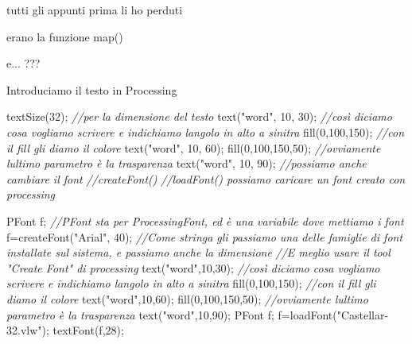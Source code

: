 \documentclass[
]{article}
\author{}
\date{}
\newenvironment{Shaded}{}{}
\newcommand{\CommentTok}[1]{\textcolor[rgb]{0.38,0.63,0.69}{\textit{#1}}}
\newcommand{\DecValTok}[1]{\textcolor[rgb]{0.25,0.63,0.44}{#1}}
\newcommand{\FunctionTok}[1]{\textcolor[rgb]{0.02,0.16,0.49}{#1}}
\newcommand{\NormalTok}[1]{#1}
\newcommand{\OperatorTok}[1]{\textcolor[rgb]{0.40,0.40,0.40}{#1}}
\newcommand{\StringTok}[1]{\textcolor[rgb]{0.25,0.44,0.63}{#1}}
\begin{document}
tutti gli appunti prima li ho perduti

erano la funzione map()

e... ???

Introduciamo il testo in Processing

\begin{Shaded}
\begin{Highlighting}[]
\FunctionTok{textSize}\OperatorTok{(}\DecValTok{32}\OperatorTok{);} \CommentTok{//per la dimensione del testo}
\FunctionTok{text}\OperatorTok{(}\StringTok{"word"}\OperatorTok{,} \DecValTok{10}\OperatorTok{,} \DecValTok{30}\OperatorTok{);} \CommentTok{//così diciamo cosa vogliamo scrivere e indichiamo l\textquotesingle{}angolo in alto a sinitra}
\FunctionTok{fill}\OperatorTok{(}\DecValTok{0}\OperatorTok{,}\DecValTok{100}\OperatorTok{,}\DecValTok{150}\OperatorTok{);} \CommentTok{//con il fill gli diamo il colore}
\FunctionTok{text}\OperatorTok{(}\StringTok{"word"}\OperatorTok{,} \DecValTok{10}\OperatorTok{,} \DecValTok{60}\OperatorTok{);}
\FunctionTok{fill}\OperatorTok{(}\DecValTok{0}\OperatorTok{,}\DecValTok{100}\OperatorTok{,}\DecValTok{150}\OperatorTok{,}\DecValTok{50}\OperatorTok{);} \CommentTok{//ovviamente l\textquotesingle{}ultimo parametro è la trasparenza}
\FunctionTok{text}\OperatorTok{(}\StringTok{"word"}\OperatorTok{,} \DecValTok{10}\OperatorTok{,} \DecValTok{90}\OperatorTok{);}
\CommentTok{//possiamo anche cambiare il font}
\CommentTok{//createFont() }
\CommentTok{//loadFont() possiamo caricare un font creato con processing}

\NormalTok{PFont f}\OperatorTok{;} \CommentTok{//PFont sta per ProcessingFont, ed è una variabile dove mettiamo i font}
\NormalTok{f}\OperatorTok{=}\FunctionTok{createFont}\OperatorTok{(}\StringTok{"Arial"}\OperatorTok{,} \DecValTok{40}\OperatorTok{);} \CommentTok{//Come stringa gli passiamo una delle famiglie di font installate sul sistema, e passiamo anche la dimensione}
    \CommentTok{//E\textquotesingle{} meglio usare il tool "Create Font" di processing}
\FunctionTok{text}\OperatorTok{(}\StringTok{"word"}\OperatorTok{,}\DecValTok{10}\OperatorTok{,}\DecValTok{30}\OperatorTok{);} \CommentTok{//così diciamo cosa vogliamo scrivere e indichiamo l\textquotesingle{}angolo in alto a sinitra}
\FunctionTok{fill}\OperatorTok{(}\DecValTok{0}\OperatorTok{,}\DecValTok{100}\OperatorTok{,}\DecValTok{150}\OperatorTok{);} \CommentTok{//con il fill gli diamo il colore}
\FunctionTok{text}\OperatorTok{(}\StringTok{"word"}\OperatorTok{,}\DecValTok{10}\OperatorTok{,}\DecValTok{60}\OperatorTok{);}
\FunctionTok{fill}\OperatorTok{(}\DecValTok{0}\OperatorTok{,}\DecValTok{100}\OperatorTok{,}\DecValTok{150}\OperatorTok{,}\DecValTok{50}\OperatorTok{);} \CommentTok{//ovviamente l\textquotesingle{}ultimo parametro è la trasparenza}
\FunctionTok{text}\OperatorTok{(}\StringTok{"word"}\OperatorTok{,}\DecValTok{10}\OperatorTok{,}\DecValTok{90}\OperatorTok{);}
\NormalTok{PFont f}\OperatorTok{;} 
\NormalTok{f}\OperatorTok{=}\FunctionTok{loadFont}\OperatorTok{(}\StringTok{"Castellar{-}32.vlw"}\OperatorTok{);} 
\FunctionTok{textFont}\OperatorTok{(}\NormalTok{f}\OperatorTok{,}\DecValTok{28}\OperatorTok{);}


\end{Highlighting}
\end{Shaded}
\end{document}
